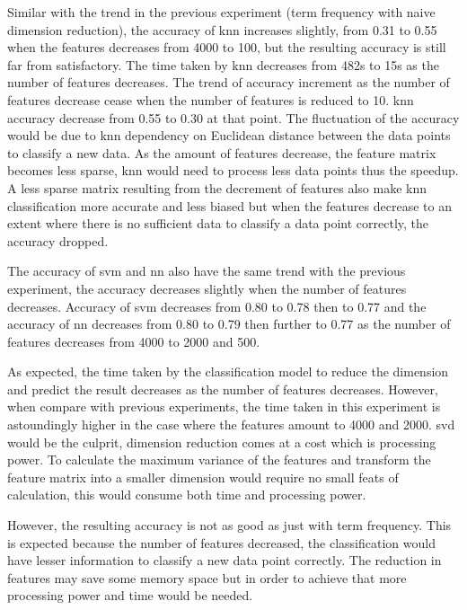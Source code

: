 Similar with the trend in the previous experiment (term frequency with naive dimension reduction), the accuracy of \ac{knn} increases slightly, from 0.31 to 0.55 when the features decreases from 4000 to 100, but the resulting accuracy is still far from satisfactory. The time taken by \ac{knn} decreases from 482s to 15s as the number of features decreases. The trend of accuracy increment as the number of features decrease cease when the number of features is reduced to 10. \Ac{knn} accuracy decrease from 0.55 to 0.30 at that point. The fluctuation of the accuracy would be due to \ac{knn} dependency on Euclidean distance between the data points to classify a new data. As the amount of features decrease, the feature matrix becomes less sparse, \ac{knn} would need to process less data points thus the speedup. A less sparse matrix resulting from the decrement of features also make \ac{knn} classification more accurate and less biased but when the features decrease to an extent where there is no sufficient data to classify a data point correctly, the accuracy dropped.

The accuracy of \ac{svm} and \ac{nn} also have the same trend with the previous experiment, the accuracy decreases slightly when the number of features decreases. Accuracy of \ac{svm} decreases from 0.80 to 0.78 then to 0.77 and the accuracy of \ac{nn} decreases from 0.80 to 0.79 then further to 0.77 as the number of features decreases from 4000 to 2000 and 500.

As expected, the time taken by the classification model to reduce the dimension and predict the result decreases as the number of features decreases. However, when compare with previous experiments, the time taken in this experiment is astoundingly higher in the case where the features amount to 4000 and 2000. \Ac{svd} would be the culprit, dimension reduction comes at a cost which is processing power. To calculate the maximum variance of the features and transform the feature matrix into a smaller dimension would require no small feats of calculation, this would consume both time and processing power.

However, the resulting accuracy is not as good as just with term frequency. This is expected because the number of features decreased, the classification would have lesser information to classify a new data point correctly. The reduction in features may save some memory space but in order to achieve that more processing power and time would be needed.

